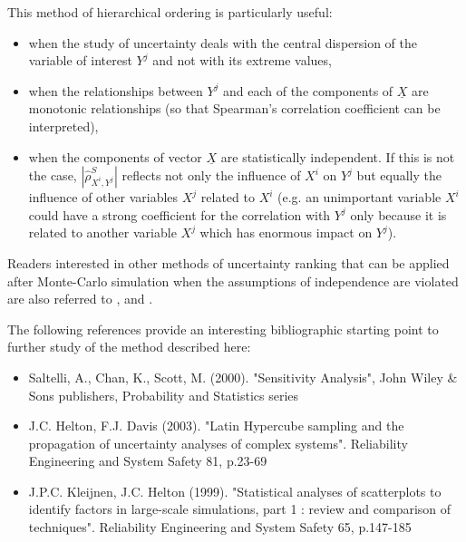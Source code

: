 {
  This method of hierarchical ordering is particularly useful:
  \begin{itemize}
  \item when the study of uncertainty deals with the central dispersion of the variable of interest $Y^j$ and not with its extreme values,
  \item when the relationships between $Y^j$ and each of the components of $\underline{X}$ are monotonic relationships (so that Spearman's correlation coefficient can be interpreted),
  \item when the components of vector $\underline{X}$ are statistically independent. If this is not the case, $\left| \widehat{\rho}^S_{X^i,Y^j} \right|$  reflects not only the influence of $X^i$ on $Y^j$ but equally the influence of  other variables $X^j$ related to $X^i$ (e.g. an unimportant variable $X^i$ could have a strong coefficient for the correlation with $Y^j$ only because it is related to another variable $X^j$ which has enormous impact on $Y^j$).
  \end{itemize}

  Readers interested in other methods of uncertainty ranking  that can be applied after Monte-Carlo simulation when the assumptions of independence are violated are also referred to ,  and .

  The following references provide an interesting bibliographic starting point to further study of the method described here:
  \begin{itemize}
  \item Saltelli, A., Chan, K., Scott, M. (2000). "Sensitivity Analysis", John Wiley \& Sons publishers, Probability and Statistics series
  \item J.C. Helton, F.J. Davis (2003). "Latin Hypercube sampling and the propagation of uncertainty analyses of complex systems". Reliability Engineering and System Safety 81, p.23-69
  \item J.P.C. Kleijnen, J.C. Helton (1999). "Statistical analyses of scatterplots to identify factors in large-scale simulations, part 1 : review and comparison of techniques". Reliability Engineering and System Safety 65, p.147-185
  \end{itemize}
}
